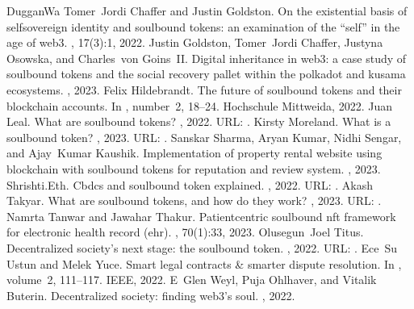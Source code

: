 \documentclass[letterpaper,10pt,english]{jupyterBook}
\begin{document}
\begin{sphinxthebibliography}{DugganWa}
\sphinxAtStartPar
Tomer Jordi Chaffer and Justin Goldston. On the existential basis of self\sphinxhyphen{}sovereign identity and soulbound tokens: an examination of the “self” in the age of web3. , 17(3):1, 2022.
\sphinxAtStartPar
Justin Goldston, Tomer Jordi Chaffer, Justyna Osowska, and Charles von Goins II. Digital inheritance in web3: a case study of soulbound tokens and the social recovery pallet within the polkadot and kusama ecosystems. , 2023.
\sphinxAtStartPar
Felix Hildebrandt. The future of soulbound tokens and their blockchain accounts. In , number 2, 18–24. Hochschule Mittweida, 2022.
\sphinxAtStartPar
Juan Leal. What are soulbound tokens? , 2022. URL: .
\sphinxAtStartPar
Kirsty Moreland. What is a soulbound token? , 2023. URL: .
\sphinxAtStartPar
Sanskar Sharma, Aryan Kumar, Nidhi Sengar, and Ajay Kumar Kaushik. Implementation of property rental website using blockchain with soulbound tokens for reputation and review system. , 2023.
\sphinxAtStartPar
Shrishti.Eth. Cbdcs and soulbound token explained. , 2022. URL: .
\sphinxAtStartPar
Akash Takyar. What are soulbound tokens, and how do they work? , 2023. URL: .
\sphinxAtStartPar
Namrta Tanwar and Jawahar Thakur. Patient\sphinxhyphen{}centric soulbound nft framework for electronic health record (ehr). , 70(1):33, 2023.
\sphinxAtStartPar
Olusegun Joel Titus. Decentralized society's next stage: the soulbound token. , 2022. URL: .
\sphinxAtStartPar
Ece Su Ustun and Melek Yuce. Smart legal contracts \& smarter dispute resolution. In , volume 2, 111–117. IEEE, 2022.
\sphinxAtStartPar
E Glen Weyl, Puja Ohlhaver, and Vitalik Buterin. Decentralized society: finding web3's soul. , 2022.
\end{sphinxthebibliography}







\renewcommand{\indexname}{Index}
\printindex
\end{document}
